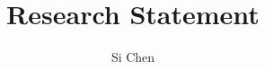 \documentclass[11pt]{article}
\begin{document}
\title{Research Statement}
\author{Si Chen}
\date{}
\maketitle

\end{document}
